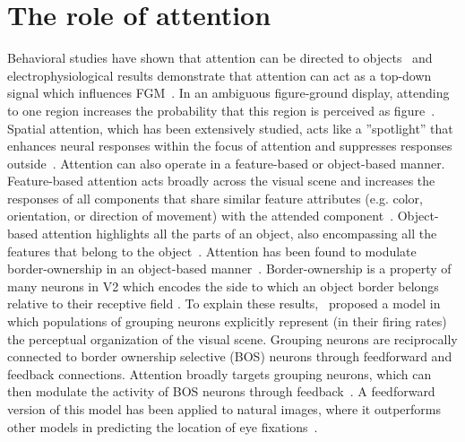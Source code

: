 \section{The role of attention}
Behavioral studies have shown that attention can be directed to objects~\citep{Egly_etal94} and electrophysiological results demonstrate that attention can act as a top-down signal which influences FGM~\citep{Qiu_etal07, Poort_etal12}. In an ambiguous figure-ground display, attending to one region increases the probability that this region is perceived as figure~\citep{Driver_Baylis96, Vecera_etal04}. Spatial attention, which has been extensively studied, acts like a ''spotlight'' that enhances neural responses within the focus of attention and suppresses responses outside~\citep{Motter93a}. Attention can also operate in a feature-based or object-based manner. Feature-based attention acts broadly across the visual scene and increases the responses of all components that share similar feature attributes (e.g. color, orientation, or direction of movement) with the attended component~\citep{Treue_Trujillo99}. Object-based attention highlights all the parts of an object, also encompassing all the features that belong to the object~\citep{Roelfsema_etal98, Schoenfeld_etal14}. Attention has been found to modulate border-ownership in an object-based manner~\citep{Qiu_etal07}. Border-ownership is a property of many neurons in V2 which encodes the side to which an object border
belongs relative to their receptive field \citep{Zhou_etal00}. To explain these results,~\citet{Craft_etal07} proposed a model in which populations of grouping neurons explicitly represent (in their firing rates) the perceptual organization of the visual scene. Grouping neurons are reciprocally connected to border ownership selective (BOS) neurons through feedforward and feedback connections. Attention broadly targets grouping neurons, which can then modulate the activity of BOS neurons through feedback~\citep{Mihalas_etal11b}. A feedforward version of this model has been applied to natural images, where it outperforms other models in predicting the location of eye fixations~\citep{Russell_etal14}.

